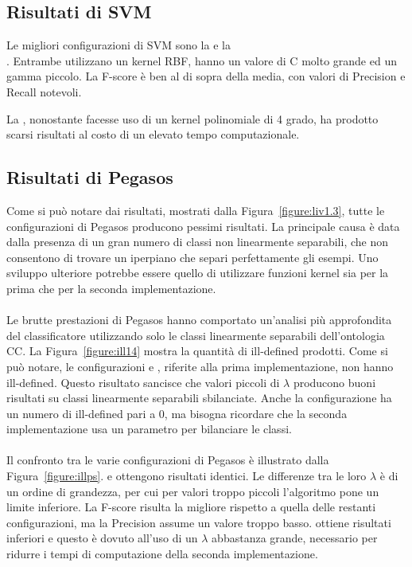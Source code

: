 \documentclass[12pt,a4paper,oneside,hidelinks]{report}
\begin{document}
\subsection{Risultati di SVM}
Le migliori configurazioni di SVM sono la  e la \\ . Entrambe utilizzano un kernel RBF, hanno un valore di C molto grande ed un gamma piccolo. La F-score è ben al di sopra della media, con valori di Precision e Recall notevoli. 

La , nonostante facesse uso di un kernel polinomiale di 4 grado, ha prodotto scarsi risultati al costo di un elevato tempo computazionale.

\subsection{Risultati di Pegasos}
Come si può notare dai risultati, mostrati dalla Figura~\ref{figure:liv1.3}, tutte le configurazioni di Pegasos producono pessimi risultati. La principale causa è data dalla presenza di un gran numero di classi non linearmente separabili, che non consentono di trovare un iperpiano che separi perfettamente gli esempi. Uno sviluppo ulteriore potrebbe essere quello di utilizzare funzioni kernel sia per la prima che per la seconda implementazione.

\paragraph*{}
Le brutte prestazioni di Pegasos hanno comportato un'analisi più approfondita del classificatore utilizzando solo le classi linearmente separabili dell'ontologia CC.
La Figura~\ref{figure:ill14} mostra la quantità di ill-defined prodotti. Come si può notare, le configurazioni  e , riferite alla prima implementazione, non hanno ill-defined. Questo risultato sancisce che valori piccoli di $\lambda$ producono buoni risultati su classi linearmente separabili sbilanciate. Anche la configurazione  ha un numero di ill-defined pari a 0, ma bisogna ricordare che la seconda implementazione usa un parametro per bilanciare le classi.

\paragraph*{}
Il confronto tra le varie configurazioni di Pegasos è illustrato dalla Figura~\ref{figure:illps}.  e  ottengono risultati identici. Le differenze tra le loro $\lambda$ è di un ordine di grandezza, per cui per valori troppo piccoli l'algoritmo pone un limite inferiore. La F-score risulta la migliore rispetto a quella delle restanti configurazioni, ma la Precision assume un valore troppo basso.  ottiene risultati inferiori e questo è dovuto all'uso di un $\lambda$ abbastanza grande, necessario per ridurre i tempi di computazione della seconda implementazione.  
\end{document}

